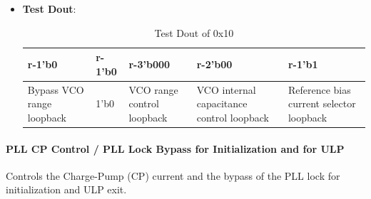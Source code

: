 \documentclass[main\_\_EN.tex]{subfiles}
\begin{document}
\begin{itemize}
\begin{itemize}
\begin{itemize}
                \end{itemize}
        \end{itemize}
    \item \textbf{Test Dout}:
        \begin{longtable}{ |p{3cm}|p{3cm}|p{3cm}|p{3cm}|p{3cm}|}
            \caption{Test Dout of 0x10}
            \label{tab:test-dout-0x10} \\
            \hline
            \rowcolor{lightgray}
            \textbf{r-1'b0} & \textbf{r-1'b0} & \textbf{r-3'b000} & \textbf{r-2'b00} & \textbf{r-1'b1} \\ \hline
            Bypass VCO range loopback & 1'b0 & VCO range control loopback & VCO internal capacitance control loopback & Reference bias current selector loopback  \\ \hline
        \end{longtable}
\end{itemize}

\paragraph{PLL CP Control / PLL Lock Bypass for Initialization and for ULP}
\label{sec:test-code-0x11}
Controls the Charge-Pump (CP) current and the bypass of the PLL lock for initialization and ULP exit.
\end{document}
